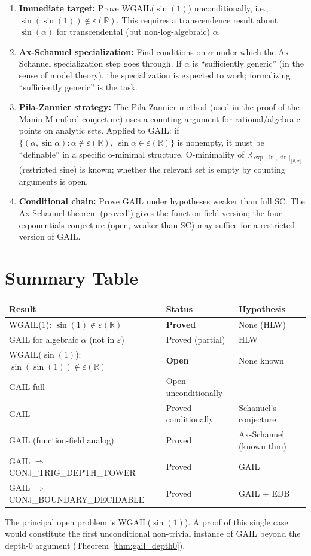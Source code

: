 \documentclass[11pt]{article}
\begin{document}
\begin{enumerate}
  \item \textbf{Immediate target:} Prove WGAIL($\sin(1)$) unconditionally,
    i.e., $\sin(\sin(1)) \notin \varepsilon(\mathbb{R})$.
    This requires a transcendence result about $\sin(\alpha)$ for
    transcendental (but non-log-algebraic) $\alpha$.

  \item \textbf{Ax-Schanuel specialization:} Find conditions on $\alpha$ under which
    the Ax-Schanuel specialization step goes through. If $\alpha$ is
    ``sufficiently generic'' (in the sense of model theory), the specialization
    is expected to work; formalizing ``sufficiently generic'' is the task.

  \item \textbf{Pila-Zannier strategy:} The Pila-Zannier method (used in
    the proof of the Manin-Mumford conjecture) uses a counting argument
    for rational/algebraic points on analytic sets. Applied to GAIL:
    if $\{(\alpha, \sin\alpha) : \alpha \notin \varepsilon(\mathbb{R}),\
    \sin\alpha \in \varepsilon(\mathbb{R})\}$ is nonempty, it must be
    ``definable'' in a specific o-minimal structure. O-minimality of
    $\mathbb{R}_{\exp, \ln, \sin|_{[0,\pi]}}$ (restricted sine) is known;
    whether the relevant set is empty by counting arguments is open.

  \item \textbf{Conditional chain:} Prove GAIL under hypotheses weaker than
    full SC. The Ax-Schanuel theorem (proved!) gives the function-field version;
    the four-exponentials conjecture (open, weaker than SC) may suffice for
    a restricted version of GAIL.
\end{enumerate}

\section{Summary Table}

\begin{center}
\renewcommand{\arraystretch}{1.2}
\begin{tabular}{lll}
\toprule
Result & Status & Hypothesis \\
\midrule
WGAIL($1$): $\sin(1) \notin \varepsilon(\mathbb{R})$ & \textbf{Proved} & None (HLW) \\
GAIL for algebraic $\alpha$ (not in $\varepsilon$) & Proved (partial) & HLW \\
WGAIL($\sin(1)$): $\sin(\sin(1)) \notin \varepsilon(\mathbb{R})$ & \textbf{Open} & None known \\
GAIL full & Open unconditionally & --- \\
GAIL & Proved conditionally & Schanuel's conjecture \\
GAIL (function-field analog) & Proved & Ax-Schanuel (known thm) \\
GAIL $\Rightarrow$ CONJ\_TRIG\_DEPTH\_TOWER & Proved & GAIL \\
GAIL $\Rightarrow$ CONJ\_BOUNDARY\_DECIDABLE & Proved & GAIL + EDB \\
\bottomrule
\end{tabular}
\end{center}

The principal open problem is WGAIL($\sin(1)$).
A proof of this single case would constitute the first unconditional
non-trivial instance of GAIL beyond the depth-0 argument (Theorem~\ref{thm:gail_depth0}).
\end{document}
